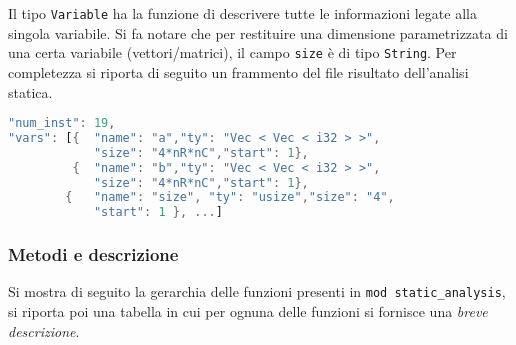 \noindent
Il tipo \texttt{Variable} ha la funzione di descrivere tutte le informazioni legate alla singola variabile. Si fa notare che per restituire una dimensione parametrizzata di una certa variabile (vettori/matrici), il campo \texttt{size} è di tipo \texttt{String}. Per completezza si riporta di seguito un frammento del file risultato dell'analisi statica.

\begin{lstlisting}[language=rust, style=boxed]
"num_inst": 19,
"vars": [{  "name": "a","ty": "Vec < Vec < i32 > >",
            "size": "4*nR*nC","start": 1},
         {  "name": "b","ty": "Vec < Vec < i32 > >",
            "size": "4*nR*nC","start": 1},
        {   "name": "size", "ty": "usize","size": "4",
            "start": 1 }, ...]
\end{lstlisting}

\noindent

\subsubsection{Metodi e descrizione}
Si mostra di seguito la gerarchia delle funzioni presenti in \texttt{mod static\_analysis}, si riporta poi una tabella in cui per ognuna delle funzioni si fornisce una \textit{breve descrizione}.\\
{
\large{
}
}

